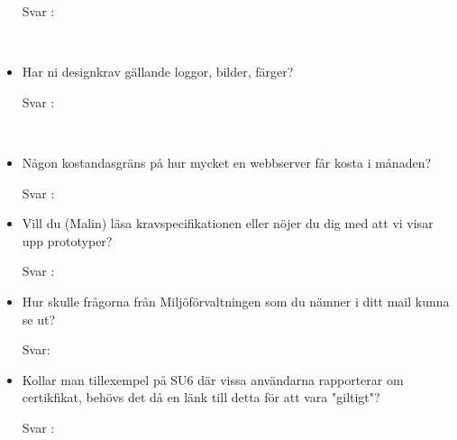 \documentclass{article}
\begin{document}
\begin{itemize}
        \begin{description}
            \item[Svar :]
        \end{description}
    \\
    \item  Har ni designkrav gällande loggor, bilder, färger?
     \begin{description}
            \item[Svar :]
        \end{description}
    \\
    \item Någon kostandasgräns på hur mycket en webbserver får kosta i månaden?
        \begin{description}
            \item[Svar :]
        \end{description}
        \item Vill du (Malin) läsa kravspecifikationen
        eller nöjer du dig med att vi visar upp
        prototyper?
         \begin{description}
            \item[Svar :]
        \end{description}

        \item Hur skulle frågorna från Miljöförvaltningen som du nämner i ditt mail kunna se ut?
        \begin{description}
        	\item[Svar:]
\end{description}      

     \item Kollar man tillexempel på SU6 där vissa användarna rapporterar om certikfikat, behövs det då en länk till detta för att vara "giltigt"? 
    
        \begin{description}
            \item[Svar :]
        \end{description}
        
\end{itemize}
\end{document}
